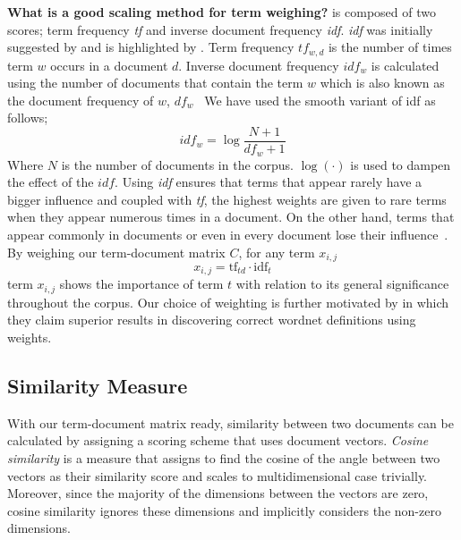 \textbf{What is a good scaling method for term weighing?}
\tfidf{} is composed of two scores; term frequency \emph{tf} and inverse document frequency \emph{idf}.
\emph{idf} was initially suggested by \textcite{jones_statistical_1972} and is highlighted by \textcite{manning_introduction_2009}.
Term frequency $tf_{w,d}$ is the number of times term $w$ occurs in a document $d$.
Inverse document frequency $idf_{w}$ is calculated using the number of documents that contain the term $w$ which is also known as the document frequency of $w$, $df_w$~\cite{manning_introduction_2009}
We have used the smooth variant of idf as follows;
\begin{equation}
    idf_w = \log{\frac{N + 1}{df_w + 1}}
\end{equation}
Where $N$ is the number of documents in the corpus. $\log(\cdot)$ is used to dampen the effect of the $idf$.
Using \emph{idf} ensures that terms that appear rarely have a bigger influence and coupled with \emph{tf}, the highest weights are given to rare terms when they appear numerous times in a document.
On the other hand, terms that appear commonly in documents or even in every document lose their influence~\cite{manning_introduction_2009}.
By weighing our term-document matrix $C$, for any term $x_{i,j}$
\begin{equation}
x_{i,j} = \text{tf}_{td} \cdot \text{idf}_{t} \end{equation}
term $x_{i,j}$ shows the importance of term $t$ with relation to its general significance throughout the corpus.
Our choice of \tfidf{} weighting is further motivated by \textcite{ruizcasadoAutomatic2005} in which they claim superior results in discovering correct wordnet definitions using \tfidf{} weights.

\subsection{Similarity Measure}%
\label{sub:similarity_measure}

With our term-document matrix ready, similarity between two documents can be calculated by assigning a scoring scheme that uses document vectors.
\emph{Cosine similarity} is a measure that assigns to find the cosine of the angle between two vectors as their similarity score and scales to multidimensional case trivially.
Moreover, since the majority of the dimensions between the vectors are zero, cosine similarity ignores these dimensions and implicitly considers the non-zero dimensions.

